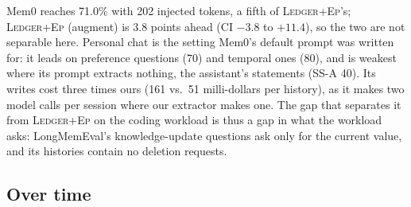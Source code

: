 \documentclass[10pt,conference]{IEEEtran}
\newcommand{\hyb}{\textsc{Ledger+Ep}}
\begin{document}
Mem0 reaches 71.0\% with 202 injected tokens, a fifth of \hyb{}'s; \hyb{}
(augment) is 3.8 points ahead (CI $-3.8$ to $+11.4$), so the two are not
separable here. Personal chat is the setting Mem0's default prompt was written
for: it leads on preference questions (70) and temporal ones (80), and is
weakest where its prompt extracts nothing, the assistant's statements (SS-A 40).
Its writes cost three times ours (161 vs.\ 51 milli-dollars per history), as it
makes two model calls per session where our extractor makes one. The gap that
separates it from \hyb{} on the coding workload is thus a gap in what the
workload asks: LongMemEval's knowledge-update questions ask only for the
current value, and its histories contain no deletion requests.

\subsection{Over time}
\end{document}

